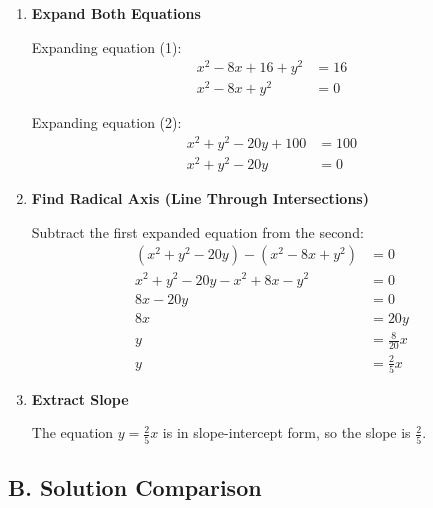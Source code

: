\documentclass[12pt]{article}
\begin{document}
\begin{solutionbox}
\begin{enumerate}[leftmargin=*]
    \item \textbf{Expand Both Equations}
    
    Expanding equation (1):
    \begin{align*}
        x^2 - 8x + 16 + y^2 &= 16 \\
        x^2 - 8x + y^2 &= 0
    \end{align*}
    
    Expanding equation (2):
    \begin{align*}
        x^2 + y^2 - 20y + 100 &= 100 \\
        x^2 + y^2 - 20y &= 0
    \end{align*}
    
    \item \textbf{Find Radical Axis (Line Through Intersections)}
    
    Subtract the first expanded equation from the second:
    \begin{align*}
        (x^2 + y^2 - 20y) - (x^2 - 8x + y^2) &= 0 \\
        x^2 + y^2 - 20y - x^2 + 8x - y^2 &= 0 \\
        8x - 20y &= 0 \\
        8x &= 20y \\
        y &= \frac{8}{20}x \\
        y &= \frac{2}{5}x
    \end{align*}
    
    \item \textbf{Extract Slope}
    
    The equation $y = \frac{2}{5}x$ is in slope-intercept form, so the slope is $\frac{2}{5}$.
\end{enumerate}

\subsection*{B. Solution Comparison}


\end{solutionbox}
\end{document}

